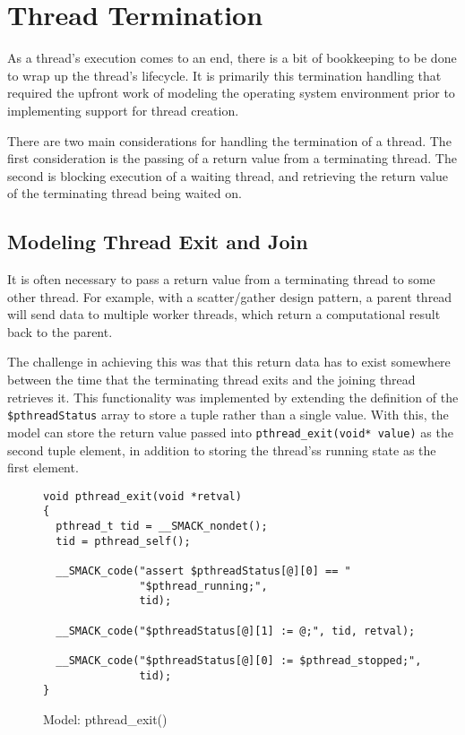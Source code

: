 \section{Thread Termination}
As a thread's execution comes to an end, there is a bit of bookkeeping
to be done to wrap up the thread's lifecycle.  It is primarily this
termination handling that required the upfront work of modeling the
operating system environment prior to implementing support for thread
creation.

There are two main considerations for handling the termination of a
thread.  The first consideration is the passing of a return value from
a terminating thread.  The second is blocking execution of a waiting
thread, and retrieving the return value of the terminating thread
being waited on.

\subsection{Modeling Thread Exit and Join}
It is often necessary to pass a return value from a terminating thread
to some other thread.  For example, with a scatter/gather design
pattern, a parent thread will send data to multiple worker threads,
which return a computational result back to the parent.

The challenge in achieving this was that this return data has to
exist somewhere between the time that the terminating thread exits
and the joining thread retrieves it.  This functionality was
implemented by extending the definition of the
\lstinline|$pthreadStatus| array to store a tuple rather than a 
single value.  With this, the model can store the return value passed
into \lstinline|pthread_exit(void* value)| as the second tuple 
element, in addition to storing the thread'ss running state as the
first element.

\begin{figure}[h]
\centering
\caption{Model: pthread\_exit()}\label{fig:pthread_exit}
\begin{lstlisting}
void pthread_exit(void *retval)
{
  pthread_t tid = __SMACK_nondet();
  tid = pthread_self();

  __SMACK_code("assert $pthreadStatus[@][0] == "
               "$pthread_running;",
               tid);

  __SMACK_code("$pthreadStatus[@][1] := @;", tid, retval);

  __SMACK_code("$pthreadStatus[@][0] := $pthread_stopped;",
               tid);
}
\end{lstlisting}
\end{figure}

